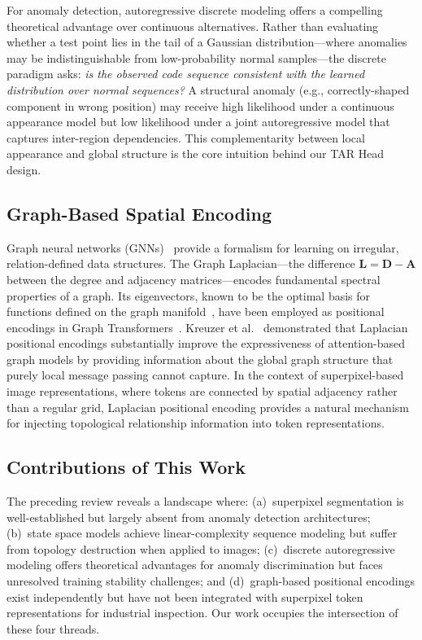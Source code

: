 \documentclass[lettersize,journal]{IEEEtran}
\begin{document}
For anomaly detection, autoregressive discrete modeling offers a compelling theoretical advantage over continuous alternatives. Rather than evaluating whether a test point lies in the tail of a Gaussian distribution---where anomalies may be indistinguishable from low-probability normal samples---the discrete paradigm asks: \textit{is the observed code sequence consistent with the learned distribution over normal sequences?} A structural anomaly (e.g., correctly-shaped component in wrong position) may receive high likelihood under a continuous appearance model but low likelihood under a joint autoregressive model that captures inter-region dependencies. This complementarity between local appearance and global structure is the core intuition behind our TAR Head design.

\subsection{Graph-Based Spatial Encoding}

Graph neural networks (GNNs)~\cite{kipf2017gcn,velickovic2018gat} provide a formalism for learning on irregular, relation-defined data structures. The Graph Laplacian---the difference $\mathbf{L} = \mathbf{D} - \mathbf{A}$ between the degree and adjacency matrices---encodes fundamental spectral properties of a graph. Its eigenvectors, known to be the optimal basis for functions defined on the graph manifold~\cite{belkin2003laplacian}, have been employed as positional encodings in Graph Transformers~\cite{dwivedi2021graph}. Kreuzer et al.~\cite{kreuzer2021rethinking} demonstrated that Laplacian positional encodings substantially improve the expressiveness of attention-based graph models by providing information about the global graph structure that purely local message passing cannot capture. In the context of superpixel-based image representations, where tokens are connected by spatial adjacency rather than a regular grid, Laplacian positional encoding provides a natural mechanism for injecting topological relationship information into token representations.

\subsection{Contributions of This Work}

The preceding review reveals a landscape where: (a)~superpixel segmentation is well-established but largely absent from anomaly detection architectures; (b)~state space models achieve linear-complexity sequence modeling but suffer from topology destruction when applied to images; (c)~discrete autoregressive modeling offers theoretical advantages for anomaly discrimination but faces unresolved training stability challenges; and (d)~graph-based positional encodings exist independently but have not been integrated with superpixel token representations for industrial inspection. Our work occupies the intersection of these four threads.
\end{document}
